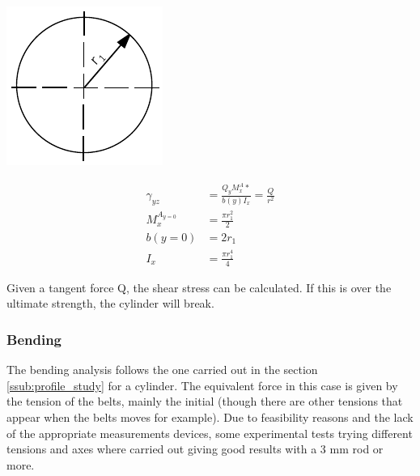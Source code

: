   \noindent\begin{minipage}{0.2\textwidth}%
  \includegraphics[width=\linewidth]{figures/profile_tube.pdf}
  \end{minipage}%
  \hfill%
  \begin{minipage}{0.8\textwidth}
    \begin{equation}
    \begin{aligned}
      \gamma_{yz} &= \frac{Q_y M_{x}^A*}{b(y) I_x} = \frac{Q}{r^2}\\
      M_{x}^{A_{y=0}} &= \frac{\pi r_1^2}{2} \\
      b(y=0) &= 2 r_1 \\
      I_x &= \frac{\pi r_1^4}{4}
      \end{aligned}
    \end{equation}
  \end{minipage}
  Given a tangent force Q, the shear stress can be calculated.
  If this is over the ultimate strength, the cylinder will break.

  \subsubsection{Bending} %
  \label{ssub:bending}
  The bending analysis follows the one carried out in the section \ref{ssub:profile_study} for a cylinder.
  The equivalent force in this case is given by the tension of the belts, mainly the initial (though there are other tensions that appear when the belts moves for example).
  Due to feasibility reasons and the lack of the appropriate measurements devices, some experimental tests trying different tensions and axes where carried out giving good results with a 3 mm rod or more.

